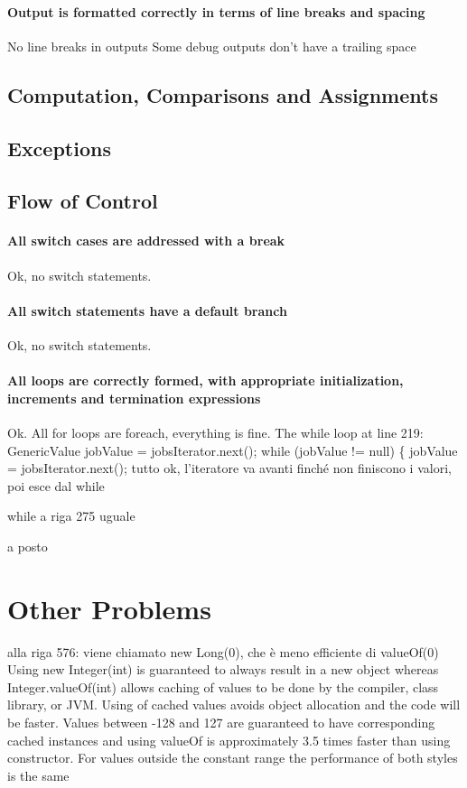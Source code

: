 \documentclass[english]{article}
\begin{document}
\paragraph{Output is formatted correctly in terms of line breaks and spacing}
No line breaks in outputs
Some debug outputs don't have a trailing space ~

\subsection{Computation, Comparisons and Assignments}

\subsection{Exceptions}


\subsection{Flow of Control}
\paragraph{All switch cases are addressed with a break}
Ok, no switch statements.

\paragraph{All switch statements have a default branch}
Ok, no switch statements.

\paragraph{All loops are correctly formed, with appropriate initialization, increments and termination expressions}
Ok.
All for loops are foreach, everything is fine.
The while loop at line 219:
GenericValue jobValue = jobsIterator.next();
while (jobValue != null) \{
jobValue = jobsIterator.next();
tutto ok, l'iteratore va avanti finché non finiscono i valori, poi esce dal while

while a riga 275 uguale

a posto

\section{Other Problems} %
alla riga 576:
viene chiamato new Long(0), che è meno efficiente di valueOf(0)
Using new Integer(int) is guaranteed to always result in a new object whereas Integer.valueOf(int) allows caching of values to be done by the compiler, class library, or JVM. Using of cached values avoids object allocation and the code will be faster.
Values between -128 and 127 are guaranteed to have corresponding cached instances and using valueOf is approximately 3.5 times faster than using constructor. For values outside the constant range the performance of both styles is the same
\end{document}
